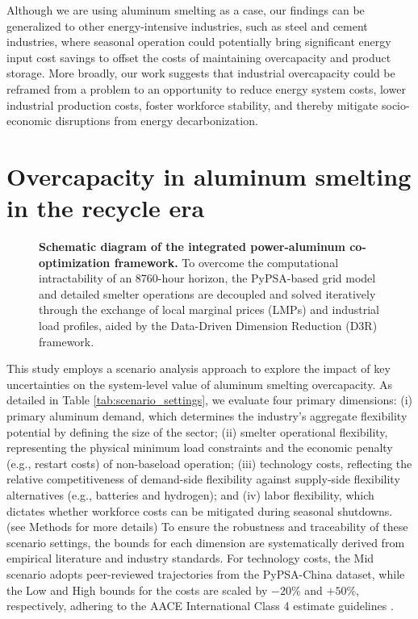 \documentclass[preprint]{elsarticle}
\begin{document}
Although we are using aluminum smelting as a case, our findings can be generalized to other energy-intensive industries, such as steel and cement industries, where seasonal operation could potentially bring significant energy input cost savings to offset the costs of maintaining overcapacity and product storage. More broadly, our work suggests that industrial overcapacity could be reframed from a problem to an opportunity to reduce energy system costs, lower industrial production costs, foster workforce stability, and thereby mitigate socio-economic disruptions from energy decarbonization.

\section*{\textbf{Overcapacity in aluminum smelting in the recycle era}}

\begin{figure}[H]
  \centering
  \caption{\textbf{Schematic diagram of the integrated power-aluminum co-optimization framework.} To overcome the computational intractability of an 8760-hour horizon, the PyPSA-based grid model and detailed smelter operations are decoupled and solved iteratively through the exchange of local marginal prices (LMPs) and industrial load profiles, aided by the Data-Driven Dimension Reduction (D3R) framework.}
  \label{fig_diagram}
\end{figure}





This study employs a scenario analysis approach to explore the impact of key uncertainties on the system-level value of aluminum smelting overcapacity. As detailed in Table \ref{tab:scenario_settings}, we evaluate four primary dimensions: (i) primary aluminum demand, which determines the industry's aggregate flexibility potential by defining the size of the sector; (ii) smelter operational flexibility, representing the physical minimum load constraints and the economic penalty (e.g., restart costs) of non-baseload operation; (iii) technology costs, reflecting the relative competitiveness of demand-side flexibility against supply-side flexibility alternatives (e.g., batteries and hydrogen); and (iv) labor flexibility, which dictates whether workforce costs can be mitigated during seasonal shutdowns. (see Methods for more details)
To ensure the robustness and traceability of these scenario settings, the bounds for each dimension are systematically derived from empirical literature and industry standards. For technology costs, the Mid scenario adopts peer-reviewed trajectories from the PyPSA-China\citep{zhou_multienergy_2024} dataset, while the Low and High bounds for the costs are scaled by $-20$\% and $+50$\%, respectively, adhering to the AACE International Class 4 estimate guidelines \citep{bates2005cost}.
\end{document}
